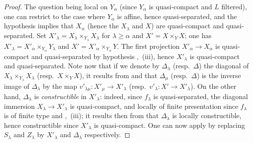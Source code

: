 \begin{proof}
The question being local on $Y_\alpha$ (since $Y_\alpha$ is quasi-compact and $L$ filtered), one can restrict to the case where $Y_\alpha$ is affine, hence quasi-separated, and the hypothesis implies that $X_\alpha$ (hence the $X_\lambda$ and $X$) are quasi-compact and quasi-separated.
Set $X'_\lambda=X_\lambda\times_{Y_\lambda}X_\lambda$ for $\lambda\geqslant\alpha$ and $X'=X\times_Y X$; one has $X'_\lambda=X'_\alpha\times_{Y_\alpha}Y_\lambda$ and $X'=X'_\alpha\times_{Y_\alpha}Y$. The first projection $X'_\alpha\to X_\alpha$ is quasi-compact and quasi-separated by hypothesis ,~(iii), hence $X'_\lambda$ is quasi-compact and quasi-separated.
Note now that if we denote by $\Delta_\lambda$ (resp.\ $\Delta$) the diagonal of $X_\lambda\times_{Y_\lambda}X_\lambda$ (resp.\ $X\times_Y X$), it results from  and  that $\Delta_\mu$ (resp.\ $\Delta$) is the inverse image of $\Delta_\lambda$ by the map $v'_{\lambda\mu}:X'_\mu\to X'_\lambda$ (resp.\ $v'_\lambda:X'\to X'_\lambda$).
On the other hand, $\Delta_\lambda$ is \emph{constructible} in $X'_\lambda$: indeed, since $f_\lambda$ is quasi-separated, the diagonal immersion $X_\lambda\to X'_\lambda$ is quasi-compact, and locally of finite presentation since $f_\lambda$ is of finite type  and ,~(iii); it results then from  that $\Delta_\lambda$ is locally constructible, hence constructible since $X'_\lambda$ is quasi-compact.
One can now apply  by replacing $S_\lambda$ and $Z_\lambda$ by $X'_\lambda$ and $\Delta_\lambda$ respectively.
\end{proof}

